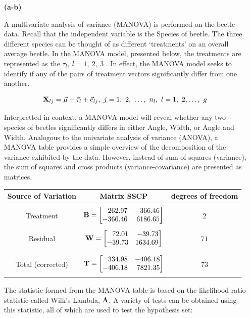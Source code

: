 \begin{enumerate}

\newpage
\item[\bf{(a-b)}]

	A multivariate analysis of variance (MANOVA) is performed on the beetle data. Recall that the independent variable is the Species of beetle. The three different species can be thought of as different `treatments' on an overall average beetle. In the MANOVA model, presented below, the treatments are represented as the $\tau_l,\ l=1,\ 2,\ 3$ \cite[301]{AMSA}. In effect, the MANOVA model seeks to identify if any of the pairs of treatment vectors significantly differ from one another. 

	$$\mf{X}_{lj} = \vec{\mu} + \vec{\tau}_l + \vec{e}_{lj},\ j=1,\ 2,\ \ldots,\ n_l,\ l = 1,\ 2, \ldots,\ g$$

	Interpretted in context, a MANOVA model will reveal whether any two species of beetles significantly differs in either Angle, Width, or Angle and Width. Analogous to the univariate analysis of variance (ANOVA), a MANOVA table provides a simple overview of the decomposition of the variance exhibited by the data. However, instead of sum of squares (variance), the sum of squares and cross products (variance-covariance) are presented as matrices. 

\begin{center}
\begin{tabular}{| c c c |} 
	\hline
	Source of Variation & Matrix SSCP & degrees of freedom \\
	\hline
	&&\\
	Treatment & $\mf{B} = \m{262.97&-366.46\\-366.46&6186.65}$ & $2$ \\
	&&\\
	Residual & $\mf{W} = \m{72.01&-39.73\\-39.73&1634.69}$ & $71$ \\
	&&\\
	\hline
	&&\\
	Total (corrected) & $\mf{T} = \m{334.98&-406.18\\-406.18&7821.35}$ & $73$ \\
	&&\\
	\hline
\end{tabular}
\end{center}

	The statistic formed from the MANOVA table is based on the likelihood ratio statistic called Wilk's Lambda, $\mathrm{\bf{\Lambda}}$. A variety of tests can be obtained using this statistic, all of which are used to test the hypothesis set:


\end{enumerate}
